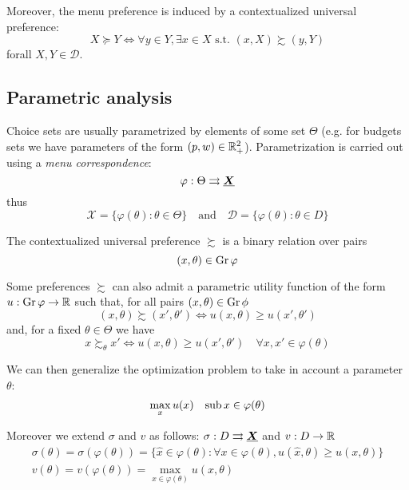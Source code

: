 \documentclass[12pt]{extarticle}
\renewcommand{\vec}[1]{\uvec{#1}}
\newcommand{\Gr}{{\operatorfont Gr} \,}
\begin{document}
Moreover, the menu preference is induced by a contextualized universal preference:
\begin{equation}
    X \succeq Y \iff \forall y \in Y, \exists x \in X \text{ s.t. } (x, X) \succsim (y, Y)
\end{equation}
forall $X, Y \in \mathcal D$.

\subsection{Parametric analysis}

Choice sets are usually parametrized by elements of some set $\Theta$ (e.g. for budgets sets we have parameters of the form $(p, w) \in \mathbb{R}^2_+$).
Parametrization is carried out using a \emph{menu correspondence}:
\begin{equation}
    \varphi: \Theta \rightrightarrows \vec X
\end{equation}
thus
\begin{equation}
    \mathcal X = \{ \varphi(\theta) : \theta \in \Theta \} \quad \text{and} \quad \mathcal D = \{ \varphi(\theta) : \theta \in D \}
\end{equation}

The contextualized universal preference $\succsim$ is a binary relation over pairs
\begin{equation}
    (x, \theta) \in \Gr \varphi
\end{equation}

Some preferences $\succsim$ can also admit a parametric utility function of the form $u : \Gr \varphi \to \R$ such that, for all pairs $(x, \theta) \in \Gr \phi$
\begin{equation}
    (x, \theta) \succsim (x', \theta') \iff u(x, \theta) \geq u(x', \theta')
\end{equation}
and, for a fixed $\theta \in \Theta$ we have
\begin{equation}
    x \succsim_\theta x' \iff u(x,\theta) \geq u(x', \theta') \quad \forall x,x' \in \varphi(\theta)
\end{equation}

We can then generalize the optimization problem to take in account a parameter $\theta$:
\begin{equation}
    \max_x u(x) \quad {\operatorfont sub} \, x \in \varphi (\theta)
\end{equation}

Moreover we extend $\sigma$ and $v$ as follows:
$\sigma : D \rightrightarrows \vec X$ and $v: D \to \mathbb{R}$
\begin{gather}
    \sigma(\theta) = \sigma(\varphi(\theta)) = \{ \hat x \in \varphi(\theta) : \forall x \in \varphi(\theta), u(\hat x, \theta) \geq u(x, \theta)\} \\
    v(\theta) = v(\varphi(\theta)) = \max_{x \in \varphi (\theta)} u(x, \theta)
\end{gather}
\end{document}
